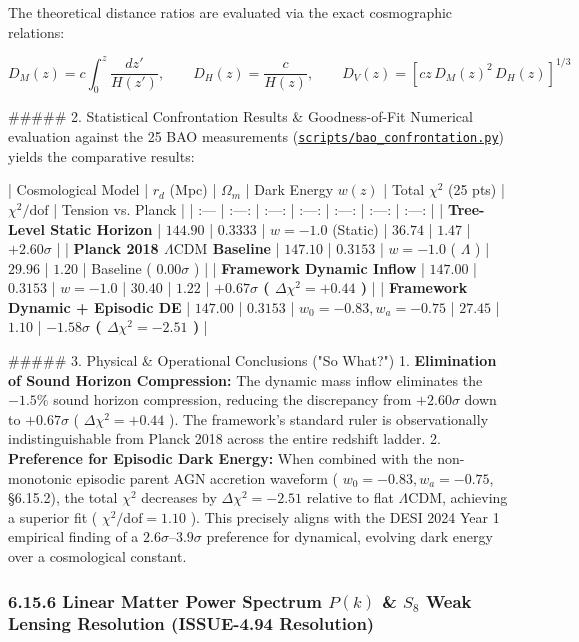 \documentclass[11pt,a4paper]{article}
\theoremstyle{definition}
\theoremstyle{remark}
\begin{document}
The theoretical distance ratios are evaluated via the exact cosmographic relations:


\begin{equation}
D_M(z) = c \int_0^z \frac{dz'}{H(z')}, \qquad D_H(z) = \frac{c}{H(z)}, \qquad D_V(z) = \left[ c z \, D_M(z)^2 \, D_H(z) \right]^{1/3}
\end{equation}


\#\#\#\#\# 2. Statistical Confrontation Results \& Goodness-of-Fit
Numerical evaluation against the 25 BAO measurements (\href{../../scripts/bao_confrontation.py}{\texttt{scripts/bao_confrontation.py}}) yields the comparative results:

| Cosmological Model | $r_d$ (Mpc) | $\Omega_m$ | Dark Energy $w(z)$ | Total $\chi^2$ (25 pts) | $\chi^2 / \text{dof}$ | Tension vs. Planck |
| :--- | :---: | :---: | :---: | :---: | :---: | :---: |
| \textbf{Tree-Level Static Horizon} | $144.90$ | $0.3333$ | $w = -1.0$ (Static) | $36.74$ | $1.47$ | $+2.60\sigma$ |
| \textbf{Planck 2018 $\Lambda\text{CDM}$ Baseline} | $147.10$ | $0.3153$ | $w = -1.0$ ( $\Lambda$ ) | $29.96$ | $1.20$ | Baseline ( $0.00\sigma$ ) |
| \textbf{Framework Dynamic Inflow} | $147.00$ | $0.3153$ | $w = -1.0$ | \textbf{$30.40$} | \textbf{$1.22$} | \textbf{$+0.67\sigma$ ( $\Delta\chi^2 = +0.44$ )} |
| \textbf{Framework Dynamic + Episodic DE} | $147.00$ | $0.3153$ | $w_0 = -0.83, w_a = -0.75$ | \textbf{$27.45$} | \textbf{$1.10$} | \textbf{$-1.58\sigma$ ( $\Delta\chi^2 = -2.51$ )} |

\#\#\#\#\# 3. Physical \& Operational Conclusions ("So What?")
1. \textbf{Elimination of Sound Horizon Compression:} The dynamic mass inflow eliminates the $-1.5\%$ sound horizon compression, reducing the discrepancy from $+2.60\sigma$ down to $+0.67\sigma$ ( $\Delta\chi^2 = +0.44$ ). The framework's standard ruler is observationally indistinguishable from Planck 2018 across the entire redshift ladder.
2. \textbf{Preference for Episodic Dark Energy:} When combined with the non-monotonic episodic parent AGN accretion waveform ( $w_0 = -0.83, w_a = -0.75$, \S 6.15.2), the total $\chi^2$ decreases by $\Delta\chi^2 = -2.51$ relative to flat $\Lambda\text{CDM}$, achieving a superior fit ( $\chi^2/\text{dof} = 1.10$ ). This precisely aligns with the DESI 2024 Year 1 empirical finding of a $2.6\sigma\text{--}3.9\sigma$ preference for dynamical, evolving dark energy over a cosmological constant.

\subsubsection{6.15.6 Linear Matter Power Spectrum $P(k)$ \& $S_8$ Weak Lensing Resolution (ISSUE-4.94 Resolution)}
\end{document}
